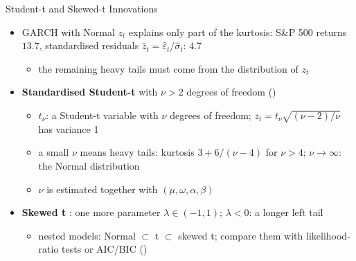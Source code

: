 \begin{frame}{Student-t and Skewed-t Innovations}
\itemsize{\small}
\begin{itemize}
    \item GARCH with Normal $z_t$ explains only part of the kurtosis: S\&P 500 returns $13.7$, standardised residuals $\hat z_t = \hat\varepsilon_t/\hat\sigma_t$: $4.7$
    \begin{itemize}
        \item the remaining heavy tails must come from the distribution of $z_t$
    \end{itemize}
    \item \textbf{Standardised Student-t} with $\nu > 2$ degrees of freedom () 
    \begin{itemize}
        \item $t_\nu$: a Student-t variable with $\nu$ degrees of freedom; $z_t = t_\nu\sqrt{(\nu - 2)/\nu}$ has variance 1
        \item a small $\nu$ means heavy tails: kurtosis $3 + 6/(\nu - 4)$ for $\nu > 4$; $\nu \to \infty$: the Normal distribution
        \item $\nu$ is estimated together with $(\mu, \omega, \alpha, \beta)$
    \end{itemize}
    \item \textbf{Skewed t} : one more parameter $\lambda \in (-1, 1)$; $\lambda < 0$: a longer left tail
    \begin{itemize}
        \item nested models: Normal $\subset$ t $\subset$ skewed t; compare them with likelihood-ratio tests or AIC/BIC ()
    \end{itemize}
\end{itemize}
\end{frame}

